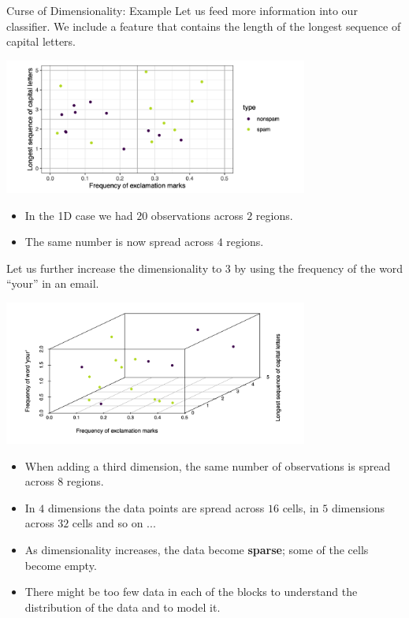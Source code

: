 \begin{vbframe}{Curse of Dimensionality: Example}
Let us feed more information into our classifier. We include a feature that contains the length of the longest sequence of capital letters.
\medskip

\vspace*{0.1cm}
\begin{center}
\includegraphics[width = 10cm ]{figure_man/capital_letters.png}
\end{center}

\begin{itemize}
\item In the 1D case we had $20$ observations across $2$ regions.
\item The same number is now spread across $4$ regions.
\end{itemize}
\framebreak


Let us further increase the dimensionality to 3 by using the frequency of the word \enquote{your} in an email.

\vspace*{0.1cm}
\begin{center}
\includegraphics[width = 10cm]{figure_man/capital_letters2.png}
\end{center}

\vspace*{-.3cm}

\framebreak

\begin{itemize}
\item When adding a third dimension, the same number of observations is spread across $8$ regions.
\item In $4$ dimensions the data points are spread across $16$ cells, in $5$ dimensions across $32$ cells and so on ...
\item As dimensionality increases, the data become \textbf{sparse}; some of the cells become empty.
\item There might be too few data in each of the blocks to understand the distribution of the data and to model it.
\end{itemize}



\end{vbframe}
